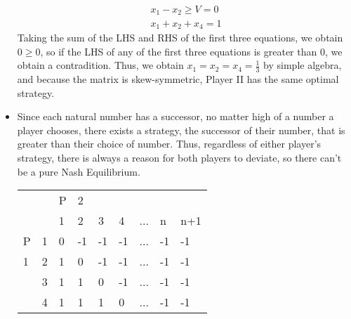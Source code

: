 \documentclass[10pt]{article}[H]
\begin{document}
\begin{itemize}
\begin{align*}
                x_1-x_2\ge V=0\\
                x_1+x_2+x_4=1
            \end{align*}
            Taking the sum of the LHS and RHS of the first three equations, we obtain $0\ge0$, so if the LHS of any of the first three equations is greater than $0$, we obtain a contradition. Thus, we obtain $x_1=x_2=x_4=\frac{1}{3}$ by simple algebra, and because the matrix is skew-symmetric, Player II has the same optimal strategy.
    \item [\textbf{Exercise 2.23}] Since each natural number has a successor, no matter high of a number a player chooses, there exists a strategy, the successor of their number, that is greater than their choice of number. 
    Thus, regardless of either player's strategy, there is always a reason for both players to deviate, so there can't be a pure Nash Equilibrium.
    \begin{table}[H]
        \begin{tabular}{lllllllll}
                               &                          & P                        & 2                        &                          &                          &                          &                          &                          \\ \cline{2-9} 
        \multicolumn{1}{l|}{}  & \multicolumn{1}{l|}{}    & \multicolumn{1}{l|}{1}   & \multicolumn{1}{l|}{2}   & \multicolumn{1}{l|}{3}   & \multicolumn{1}{l|}{4}   & \multicolumn{1}{l|}{...} & \multicolumn{1}{l|}{n}   & \multicolumn{1}{l|}{n+1} \\ \cline{2-9} 
        \multicolumn{1}{l|}{P} & \multicolumn{1}{l|}{1}   & \multicolumn{1}{l|}{0}   & \multicolumn{1}{l|}{-1}  & \multicolumn{1}{l|}{-1}  & \multicolumn{1}{l|}{-1}  & \multicolumn{1}{l|}{...} & \multicolumn{1}{l|}{-1}  & \multicolumn{1}{l|}{-1}  \\ \cline{2-9} 
        \multicolumn{1}{l|}{1} & \multicolumn{1}{l|}{2}   & \multicolumn{1}{l|}{1}   & \multicolumn{1}{l|}{0}   & \multicolumn{1}{l|}{-1}  & \multicolumn{1}{l|}{-1}  & \multicolumn{1}{l|}{...} & \multicolumn{1}{l|}{-1}  & \multicolumn{1}{l|}{-1}  \\ \cline{2-9} 
        \multicolumn{1}{l|}{}  & \multicolumn{1}{l|}{3}   & \multicolumn{1}{l|}{1}   & \multicolumn{1}{l|}{1}   & \multicolumn{1}{l|}{0}   & \multicolumn{1}{l|}{-1}  & \multicolumn{1}{l|}{...} & \multicolumn{1}{l|}{-1}  & \multicolumn{1}{l|}{-1}  \\ \cline{2-9} 
        \multicolumn{1}{l|}{}  & \multicolumn{1}{l|}{4}   & \multicolumn{1}{l|}{1}   & \multicolumn{1}{l|}{1}   & \multicolumn{1}{l|}{1}   & \multicolumn{1}{l|}{0}   & \multicolumn{1}{l|}{...} & \multicolumn{1}{l|}{-1}  & \multicolumn{1}{l|}{-1}  \\ \cline{2-9} 

\end{tabular}
\end{table}
\end{itemize}
\end{document}
